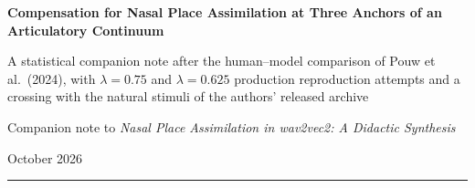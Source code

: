 \documentclass[11pt,a4paper]{article}
\newcommand{\lam}{\lambda}
\begin{document}
\begin{center}
  {\LARGE\bfseries Compensation for Nasal Place Assimilation at Three
    Anchors of an Articulatory Continuum\par}
  \vspace{6pt}
  {\large A statistical companion note after the human--model comparison
    of Pouw et al.\ (2024), with $\lam=0.75$ and $\lam=0.625$
    production reproduction attempts and a crossing with the natural
    stimuli of the authors' released archive\par}
  \vspace{10pt}
  {\normalsize Companion note to \emph{Nasal Place Assimilation in
    wav2vec2: A Didactic Synthesis}\par}
  \vspace{2pt}
  {\small October 2026\par}
\end{center}

\vspace{4pt}
\noindent\rule{\textwidth}{0.6pt}
\vspace{2pt}
\end{document}
